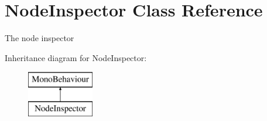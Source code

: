 \hypertarget{class_node_inspector}{}\section{Node\+Inspector Class Reference}
\label{class_node_inspector}


The node inspector  


Inheritance diagram for Node\+Inspector\+:\begin{figure}[H]
\begin{center}
\leavevmode
\includegraphics[height=2.000000cm]{class_node_inspector}
\end{center}
\end{figure}
